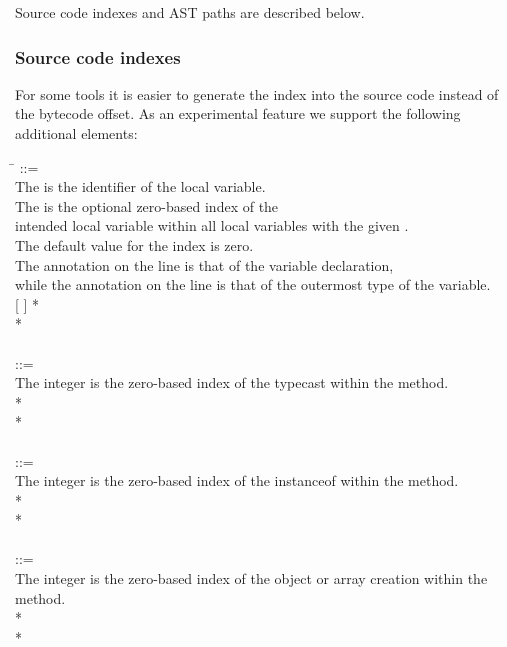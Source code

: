 \documentclass{article}
\begin{document}
Source code indexes and AST paths are described below.

\subsubsection{Source code indexes\label{source-code-index}}

For some tools it is easier to generate the index into the source code
instead of the bytecode offset.
As an experimental feature we support the following additional
elements:


\begin{tabbing}
\qquad \= \kill
{} ::= \\
\qquad    \bnfcmt The  is the identifier of the local variable.\\
\qquad    \bnfcmt The  is the optional zero-based index of the\\
\qquad    \bnfcmt intended local variable within all local variables with the given
.\\
\qquad    \bnfcmt The default value for the index is zero.\\
\qquad    \bnfcmt The annotation on the  line is that of the variable declaration, \\
\qquad    \bnfcmt while the annotation on the  line is that of the outermost type of the variable. \\
\qquad    {}  [\bnflit{*} ] \bnflit{:} * \lineend \\
\qquad    {}* \\
\\
 ::= \\
\qquad    \bnfcmt The integer is the zero-based index of the
typecast within the method. \\
\qquad    {} \bnflit{*}  \bnflit{:} * \lineend \\
\qquad    {}* \\
\\
 ::= \\
\qquad    \bnfcmt The integer is the zero-based index of the
instanceof within the method. \\
\qquad    {} \bnflit{*}  \bnflit{:} * \lineend \\
\qquad    {}* \\
\\
 ::= \\
\qquad    \bnfcmt The integer is the zero-based index of the
object or array creation within the method. \\
\qquad    {} \bnflit{*}  \bnflit{:} * \lineend  \\
\qquad    {}*
\end{tabbing}
\end{document}
